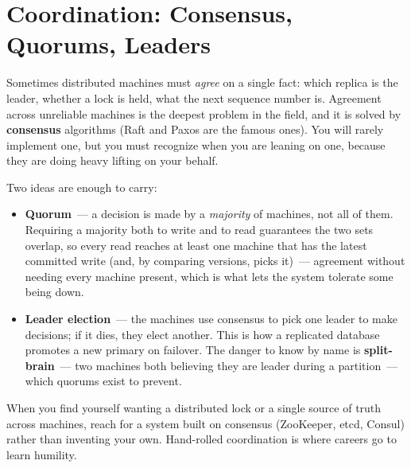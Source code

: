 \setcounter{section}{6}
\section{Coordination: Consensus, Quorums, Leaders}\label{40-distributed-systems:407-coordination-consensus-quorums-leaders}

Sometimes distributed machines must \emph{agree} on a single fact: which replica is the leader, whether a lock is held, what the next sequence number is. Agreement across unreliable machines is the deepest problem in the field, and it is solved by \textbf{consensus} algorithms (Raft and Paxos are the famous ones). You will rarely implement one, but you must recognize when you are leaning on one, because they are doing heavy lifting on your behalf.

Two ideas are enough to carry:

\begin{itemize}
\tightlist
\item
  \textbf{Quorum}~--- a decision is made by a \emph{majority} of machines, not all of them. Requiring a majority both to write and to read guarantees the two sets overlap, so every read reaches at least one machine that has the latest committed write (and, by comparing versions, picks it)~--- agreement without needing every machine present, which is what lets the system tolerate some being down.
\item
  \textbf{Leader election}~--- the machines use consensus to pick one leader to make decisions; if it dies, they elect another. This is how a replicated database promotes a new primary on failover. The danger to know by name is \textbf{split-brain}~--- two machines both believing they are leader during a partition~--- which quorums exist to prevent.
\end{itemize}

\noindent{}When you find yourself wanting a distributed lock or a single source of truth across machines, reach for a system built on consensus (ZooKeeper, etcd, Consul) rather than inventing your own. Hand-rolled coordination is where careers go to learn humility.

